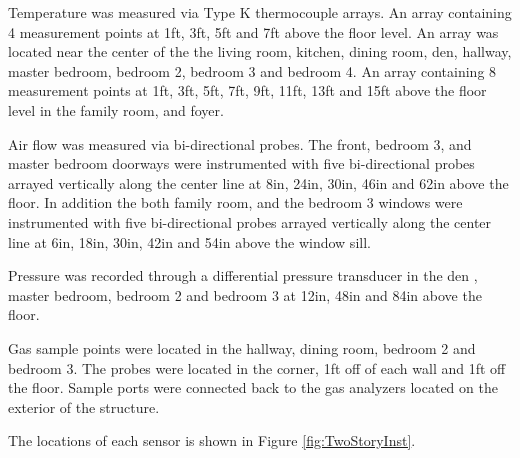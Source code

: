 \documentclass{article}
\begin{document}
Temperature was measured via Type K thermocouple arrays. An array containing 4 measurement points at 1ft, 3ft, 5ft and 7ft above the floor level. An array was located near the center of the the living room, kitchen, dining room, den, hallway, master bedroom, bedroom 2, bedroom 3 and bedroom 4. An array containing 8 measurement points at 1ft, 3ft, 5ft, 7ft, 9ft, 11ft, 13ft and 15ft above the floor level in the family room, and foyer.

Air flow was measured via bi-directional probes. The front, bedroom 3, and master bedroom doorways were instrumented with five bi-directional probes arrayed vertically along the center line at 8in, 24in, 30in, 46in and 62in above the floor. In addition the both family room, and the bedroom 3 windows were instrumented with five bi-directional probes arrayed vertically along the center line at 6in, 18in, 30in, 42in and 54in above the window sill. 

Pressure was recorded through a differential pressure transducer in the den , master bedroom, bedroom 2 and bedroom 3 at 12in, 48in and 84in above the floor. 

Gas sample points were located in the hallway, dining room, bedroom 2 and bedroom 3. The probes were located in the corner, 1ft off of each wall and 1ft off the floor. Sample ports were connected back to the gas analyzers located on the exterior of the structure. 

The locations of each sensor is shown in Figure \ref{fig:TwoStoryInst}.
\end{document}
